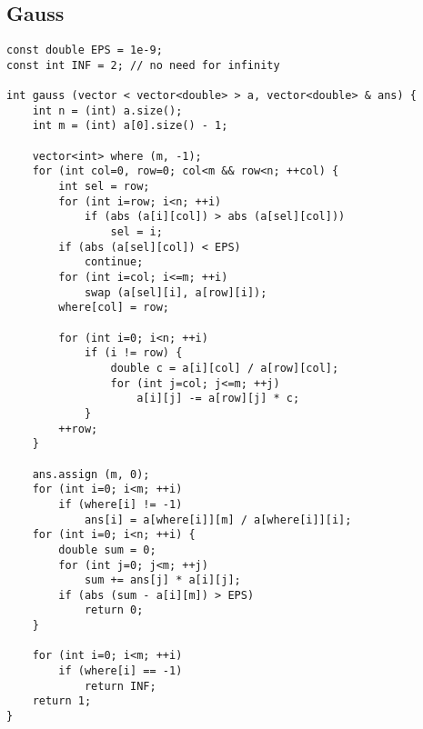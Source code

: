 \documentclass{article}
\begin{document}
\subsection{Gauss}
\begin{lstlisting}
const double EPS = 1e-9;
const int INF = 2; // no need for infinity

int gauss (vector < vector<double> > a, vector<double> & ans) {
    int n = (int) a.size();
    int m = (int) a[0].size() - 1;

    vector<int> where (m, -1);
    for (int col=0, row=0; col<m && row<n; ++col) {
        int sel = row;
        for (int i=row; i<n; ++i)
            if (abs (a[i][col]) > abs (a[sel][col]))
                sel = i;
        if (abs (a[sel][col]) < EPS)
            continue;
        for (int i=col; i<=m; ++i)
            swap (a[sel][i], a[row][i]);
        where[col] = row;

        for (int i=0; i<n; ++i)
            if (i != row) {
                double c = a[i][col] / a[row][col];
                for (int j=col; j<=m; ++j)
                    a[i][j] -= a[row][j] * c;
            }
        ++row;
    }

    ans.assign (m, 0);
    for (int i=0; i<m; ++i)
        if (where[i] != -1)
            ans[i] = a[where[i]][m] / a[where[i]][i];
    for (int i=0; i<n; ++i) {
        double sum = 0;
        for (int j=0; j<m; ++j)
            sum += ans[j] * a[i][j];
        if (abs (sum - a[i][m]) > EPS)
            return 0;
    }

    for (int i=0; i<m; ++i)
        if (where[i] == -1)
            return INF;
    return 1;
}
\end{lstlisting}
\end{document}
